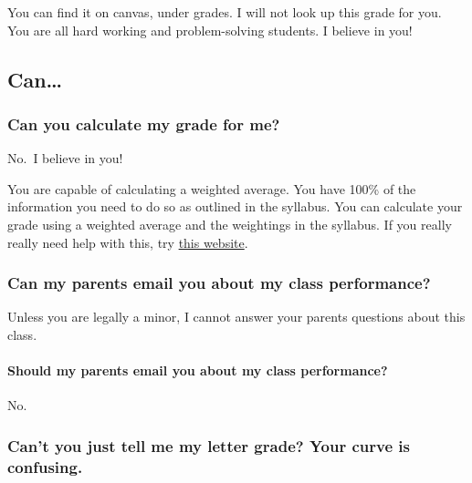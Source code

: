 \documentclass[
]{book}
\begin{document}
You can find it on canvas, under grades. I will not look up this grade for you. You are all hard working and problem-solving students. I believe in you!

\hypertarget{can}{%
\subsection{Can\ldots{}}\label{can}}

\hypertarget{can-you-calculate-my-grade-for-me}{%
\subsubsection{Can you calculate my grade for me?}\label{can-you-calculate-my-grade-for-me}}

No.~I believe in you!

You are capable of calculating a weighted average.
You have 100\% of the information you need to do so as outlined in the syllabus.
You can calculate your grade using a weighted average and the weightings in the syllabus.
If you really really need help with this, try \href{https://thegradecalculator.com/}{this website}.

\hypertarget{can-my-parents-email-you-about-my-class-performance}{%
\subsubsection{Can my parents email you about my class performance?}\label{can-my-parents-email-you-about-my-class-performance}}

Unless you are legally a minor, I cannot answer your parents questions about this class.

\hypertarget{should-my-parents-email-you-about-my-class-performance}{%
\paragraph{Should my parents email you about my class performance?}\label{should-my-parents-email-you-about-my-class-performance}}

No.

\hypertarget{cant-you-just-tell-me-my-letter-grade-your-curve-is-confusing.}{%
\subsubsection{Can't you just tell me my letter grade? Your curve is confusing.}\label{cant-you-just-tell-me-my-letter-grade-your-curve-is-confusing.}}
\end{document}
